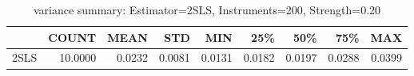 \begin{table}[ht]
\centering
\caption{variance summary: Estimator=2SLS, Instruments=200, Strength=0.20}
\begin{tabular}{lrrrrrrrr}
\toprule
 & COUNT & MEAN & STD & MIN & 25\% & 50\% & 75\% & MAX \\
\midrule
2SLS & 10.0000 & 0.0232 & 0.0081 & 0.0131 & 0.0182 & 0.0197 & 0.0288 & 0.0399 \\
\bottomrule
\end{tabular}
\end{table}

